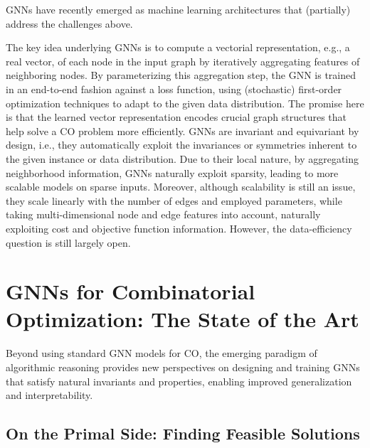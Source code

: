 \documentclass[10pt]{book}
\begin{document}
GNNs have recently emerged as machine learning architectures that (partially) address the challenges above.

The key idea underlying GNNs is to compute a vectorial representation, e.g., a real vector, of each node in the input graph by iteratively aggregating features of neighboring nodes. By parameterizing this aggregation step, the GNN is trained in an end-to-end fashion against a loss function, using (stochastic) first-order optimization techniques to adapt to the given data distribution. The promise here is that the learned vector representation encodes crucial graph structures that help solve a CO problem more efficiently. GNNs are invariant and equivariant by design, i.e., they automatically exploit the invariances or symmetries inherent to the given instance or data distribution. Due to their local nature, by aggregating neighborhood information, GNNs naturally exploit sparsity, leading to more scalable models on sparse inputs. Moreover, although scalability is still an issue, they scale linearly with the number of edges and employed parameters, while taking multi-dimensional node and edge features into account, naturally exploiting cost and objective function information. However, the data-efficiency question is still largely open.

\section{GNNs for Combinatorial Optimization: The State of the Art}
    
Beyond using standard GNN models for CO, the emerging paradigm of algorithmic reasoning provides new perspectives on designing and training GNNs that satisfy natural invariants and properties, enabling improved generalization and interpretability.

\subsection{On the Primal Side: Finding Feasible Solutions}
\end{document}
